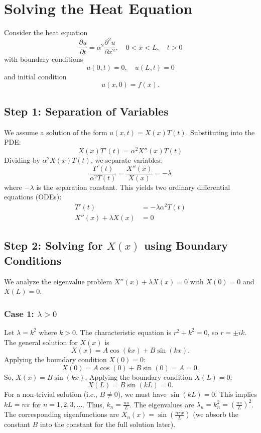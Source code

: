 \documentclass{article}
\begin{document}
	\section*{Solving the Heat Equation}
	
	Consider the heat equation
	$$ \frac{\partial u}{\partial t} = \alpha^2 \frac{\partial^2 u}{\partial x^2}, \quad 0 < x < L, \quad t > 0 $$
	with boundary conditions
	$$ u(0,t) = 0, \quad u(L,t) = 0 $$
	and initial condition
	$$ u(x,0) = f(x). $$
	
	\subsection*{Step 1: Separation of Variables}
	We assume a solution of the form $u(x,t) = X(x)T(t)$. Substituting into the PDE:
	$$ X(x)T'(t) = \alpha^2 X''(x)T(t) $$
	Dividing by $\alpha^2 X(x)T(t)$, we separate variables:
	$$ \frac{T'(t)}{\alpha^2 T(t)} = \frac{X''(x)}{X(x)} = -\lambda $$
	where $-\lambda$ is the separation constant. This yields two ordinary differential equations (ODEs):
	\begin{align*} T'(t) &= -\lambda \alpha^2 T(t) \\ X''(x) + \lambda X(x) &= 0 \end{align*}
	
	\subsection*{Step 2: Solving for $X(x)$ using Boundary Conditions}
	We analyze the eigenvalue problem $X''(x) + \lambda X(x) = 0$ with $X(0)=0$ and $X(L)=0$.
	
	\subsubsection*{Case 1: $\lambda > 0$}
	Let $\lambda = k^2$ where $k > 0$. The characteristic equation is $r^2 + k^2 = 0$, so $r = \pm ik$.
	The general solution for $X(x)$ is
	$$ X(x) = A \cos(kx) + B \sin(kx). $$
	Applying the boundary condition $X(0) = 0$:
	$$ X(0) = A \cos(0) + B \sin(0) = A = 0. $$
	So, $X(x) = B \sin(kx)$.
	Applying the boundary condition $X(L) = 0$:
	$$ X(L) = B \sin(kL) = 0. $$
	For a non-trivial solution (i.e., $B \neq 0$), we must have $\sin(kL) = 0$. This implies $kL = n\pi$ for $n=1, 2, 3, \ldots$.
	Thus, $k_n = \frac{n\pi}{L}$.
	The eigenvalues are $\lambda_n = k_n^2 = \left(\frac{n\pi}{L}\right)^2$.
	The corresponding eigenfunctions are $X_n(x) = \sin\left(\frac{n\pi x}{L}\right)$ (we absorb the constant $B$ into the constant for the full solution later).
	
\end{document}
